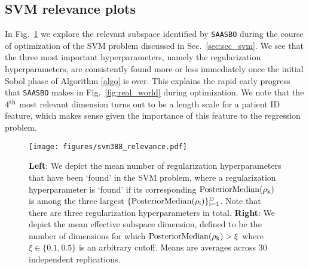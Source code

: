 \documentclass[accepted]{uai2021} %
\newcommand{\algoname}{{\texttt {SAASBO}}}
\begin{document}
\subsection{SVM relevance plots}
In Fig.~\ref{fig:svm388relevance} we explore the relevant subspace identified by \algoname{}
during the course of optimization of the SVM problem discussed in Sec.~\ref{sec:sec_svm}.
We see that the three most important hyperparameters, namely the regularization hyperparameters,
are consistently found more or less immediately once the initial Sobol phase of Algorithm \ref{algo}
is over.
This explains the rapid early progress that \algoname{} makes in Fig.~\ref{fig:real_world}
during optimization. We note that the $4^{\rm th}$ most relevant dimension turns out to be a length
scale for a patient ID feature, which makes sense given the importance of this feature to the
regression problem.
\begin{figure}[!ht]
  \centering
  \texttt{[image: figures/svm388\_relevance.pdf]}
  \caption{
  {\bf Left}: We depict the mean number of regularization hyperparameters that have been
  `found' in the SVM problem, where
  a regularization hyperparameter is `found' if its corresponding $\rm{PosteriorMedian}(\rho_k)$
  is among the three largest $\{ \rm{PosteriorMedian}(\rho_i) \}_{i=1}^D$.
    Note that there are three regularization hyperparameters in total.
  {\bf Right}: We depict the mean effective subspace dimension, defined to be the number of dimensions
    for which ${\rm{PosteriorMedian}(\rho_k) > \xi}$ where $\xi \in \{0.1, 0.5\}$ is an arbitrary cutoff.
    Means are averages across $30$ independent replications. }
  \label{fig:svm388relevance}
\end{figure}
\end{document}
